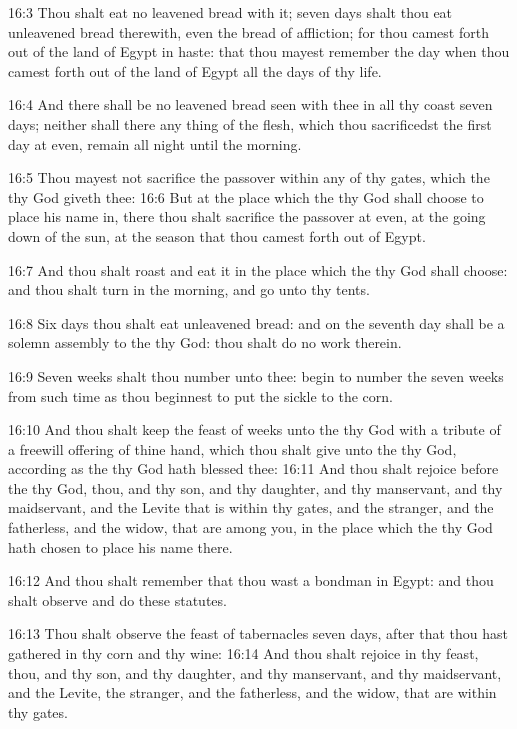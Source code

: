 16:3 Thou shalt eat no leavened bread with it; seven days shalt thou
eat unleavened bread therewith, even the bread of affliction; for thou
camest forth out of the land of Egypt in haste: that thou mayest
remember the day when thou camest forth out of the land of Egypt all
the days of thy life.

16:4 And there shall be no leavened bread seen with thee in all thy
coast seven days; neither shall there any thing of the flesh, which
thou sacrificedst the first day at even, remain all night until the
morning.

16:5 Thou mayest not sacrifice the passover within any of thy gates,
which the \LORD thy God giveth thee: 16:6 But at the place which the
\LORD thy God shall choose to place his name in, there thou shalt
sacrifice the passover at even, at the going down of the sun, at the
season that thou camest forth out of Egypt.

16:7 And thou shalt roast and eat it in the place which the \LORD thy
God shall choose: and thou shalt turn in the morning, and go unto thy
tents.

16:8 Six days thou shalt eat unleavened bread: and on the seventh day
shall be a solemn assembly to the \LORD thy God: thou shalt do no work
therein.

16:9 Seven weeks shalt thou number unto thee: begin to number the
seven weeks from such time as thou beginnest to put the sickle to the
corn.

16:10 And thou shalt keep the feast of weeks unto the \LORD thy God
with a tribute of a freewill offering of thine hand, which thou shalt
give unto the \LORD thy God, according as the \LORD thy God hath blessed
thee: 16:11 And thou shalt rejoice before the \LORD thy God, thou, and
thy son, and thy daughter, and thy manservant, and thy maidservant,
and the Levite that is within thy gates, and the stranger, and the
fatherless, and the widow, that are among you, in the place which the
\LORD thy God hath chosen to place his name there.

16:12 And thou shalt remember that thou wast a bondman in Egypt: and
thou shalt observe and do these statutes.

16:13 Thou shalt observe the feast of tabernacles seven days, after
that thou hast gathered in thy corn and thy wine: 16:14 And thou shalt
rejoice in thy feast, thou, and thy son, and thy daughter, and thy
manservant, and thy maidservant, and the Levite, the stranger, and the
fatherless, and the widow, that are within thy gates.

